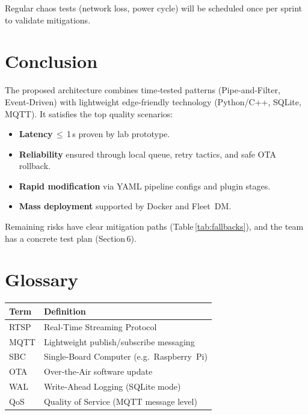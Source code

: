 \documentclass[11pt,a4paper]{article}
\begin{document}
Regular chaos tests (network loss, power cycle) will be scheduled once per sprint to validate mitigations.

\section{Conclusion}

The proposed architecture combines time‑tested patterns (Pipe‑and‑Filter, Event‑Driven) with lightweight edge‑friendly technology (Python/C++, SQLite, MQTT).  
It satisfies the top quality scenarios:

\begin{itemize}
  \item \textbf{Latency} $\le$ 1 s proven by lab prototype.  
  \item \textbf{Reliability} ensured through local queue, retry tactics, and safe OTA rollback.  
  \item \textbf{Rapid modification} via YAML pipeline configs and plugin stages.  
  \item \textbf{Mass deployment} supported by Docker and Fleet DM.  
\end{itemize}

Remaining risks have clear mitigation paths (Table \ref{tab:fallbacks}), and the team has a concrete test plan (Section 6). 

\appendix

\section{Glossary}
\begin{tabular}{|p{3cm}|p{9cm}|}
\hline
\textbf{Term} & \textbf{Definition} \\ \hline
RTSP & Real‑Time Streaming Protocol \\ \hline
MQTT & Lightweight publish/subscribe messaging \\ \hline
SBC & Single‑Board Computer (e.g.\ Raspberry Pi) \\ \hline
OTA & Over‑the‑Air software update \\ \hline
WAL & Write‑Ahead Logging (SQLite mode) \\ \hline
QoS & Quality of Service (MQTT message level) \\ \hline
\end{tabular}
\end{document}
